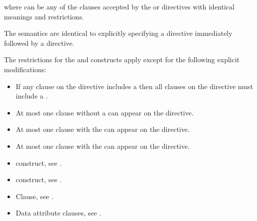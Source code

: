 where  can be any of the clauses accepted by the  or 
 directives with identical meanings and restrictions.
\fortranspecificend

\descr
The semantics are identical to explicitly specifying a  directive 
immediately followed by a  directive. 

\restrictions

The restrictions for the  and  constructs apply except for the following explicit modifications:

\begin{itemize}
\item If any  clause on the directive includes a
       then all  clauses 
      on the directive must include a .

\item At most one  clause without a 
       can appear on the directive.

\item At most one  clause with the  
       can appear on the directive.


\item At most one  clause with the  
       can appear on the directive.
\end{itemize}

\crossreferences
\begin{itemize}
\item {} construct, see 
.

\item {} construct, see 
.

\item {} Clause, see .

\item Data attribute clauses, see 
.


\end{itemize}









